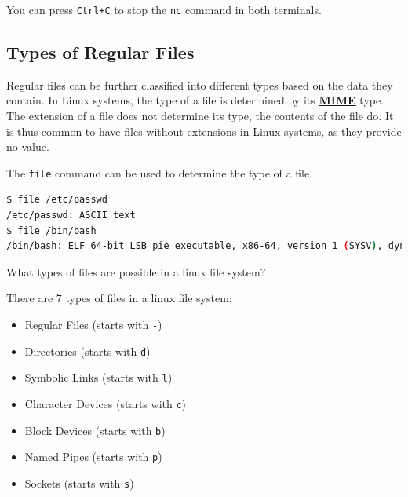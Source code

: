 You can press \texttt{Ctrl+C} to stop the \texttt{nc} command in both terminals.

\subsection{Types of Regular Files}

Regular files can be further classified into different types based on the data they contain.
In Linux systems, the type of a file is determined by its \textbf{
  \href{https://developer.mozilla.org/en-US/docs/Web/HTTP/Basics_of_HTTP/MIME_types}{MIME}
} type.
The extension of a file does not determine its type, the contents of the file do.
It is thus common to have files without extensions in Linux systems, as they provide no value.


The \texttt{file} command can be used to determine the type of a file.

\begin{lstlisting}[language=bash]
$ file /etc/passwd
/etc/passwd: ASCII text
$ file /bin/bash
/bin/bash: ELF 64-bit LSB pie executable, x86-64, version 1 (SYSV), dynamically linked, interpreter /lib64/ld-linux-x86-64.so.2, BuildID[sha1]=165d3a5ffe12a4f1a9b71c84f48d94d5e714d3db, for GNU/Linux 4.4.0, stripped
\end{lstlisting}

\begin{qs}
  What types of files are possible in a linux file system?
\end{qs}

\begin{ans}
  There are 7 types of files in a linux file system:
  \begin{itemize}
    \item Regular Files (starts with \texttt{-})
    \item Directories (starts with \texttt{d})
    \item Symbolic Links (starts with \texttt{l})
    \item Character Devices (starts with \texttt{c})
    \item Block Devices (starts with \texttt{b})
    \item Named Pipes (starts with \texttt{p})
    \item Sockets (starts with \texttt{s})
  \end{itemize}
\end{ans}


